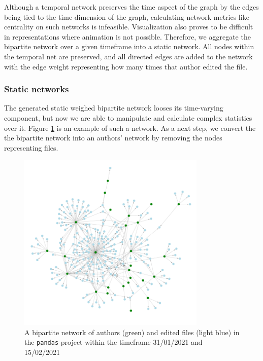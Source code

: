 Although a temporal network preserves the time aspect of the graph by the edges being tied to the time dimension of the graph, calculating network metrics like centrality on such networks is infeasible. Visualization also proves to be difficult in representations where animation is not possible. Therefore, we aggregate the bipartite network over a given timeframe into a static network. All nodes within the temporal net are preserved, and all directed edges are added to the network with the edge weight representing how many times that author edited the file. \\

\subsubsection{Static networks}
The generated static weighed bipartite network looses its time-varying component, but now we are able to manipulate and calculate complex statistics over it. Figure \ref{fig:bipartite} is an example of such a network. As a next step, we convert the the bipartite network into an authors' network by removing the nodes representing files. \\

\begin{figure}
    \centering
    \includegraphics[width=0.8\textwidth]{figures/bipartite.png}
    \caption{A bipartite network of authors (green) and edited files (light blue) in the \texttt{pandas} project within the timeframe 31/01/2021 and 15/02/2021}
    \label{fig:bipartite}
\end{figure}


